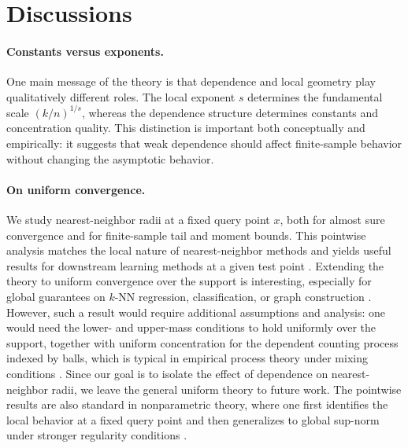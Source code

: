 \documentclass[12pt]{article}
\theoremstyle{definition}
\begin{document}
\section{Discussions}\label{sec:discussions}

\paragraph*{Constants versus exponents.}
One main message of the theory is that dependence and local geometry play qualitatively different roles. The local exponent $s$ determines the fundamental scale $(k/n)^{1/s}$, whereas the dependence structure determines constants and concentration quality. This distinction is important both conceptually and empirically: it suggests that weak dependence should affect finite-sample behavior without changing the asymptotic behavior.

\paragraph*{On uniform convergence.} We study nearest-neighbor radii at a fixed query point $x$, both for almost sure convergence and for finite-sample tail and moment bounds. This pointwise analysis matches the local nature of nearest-neighbor methods and yields useful results for downstream learning methods at a given test point \citep{biau2015lectures}. Extending the theory to uniform convergence over the support is interesting, especially for global guarantees on $k$-NN regression, classification, or graph construction \citep{biau2015lectures, jiang2019non}. However, such a result would require additional assumptions and analysis: one would need the lower- and upper-mass conditions to hold uniformly over the support, together with uniform concentration for the dependent counting process indexed by balls, which is typical in empirical process theory under mixing conditions \citep{yu1994rates}. Since our goal is to isolate the effect of dependence on nearest-neighbor radii, we leave the general uniform theory to future work. The pointwise results are also standard in nonparametric theory, where one first identifies the local behavior at a fixed query point and then generalizes to global sup-norm under stronger regularity conditions \citep{gyorfi2002distribution}.
\end{document}
